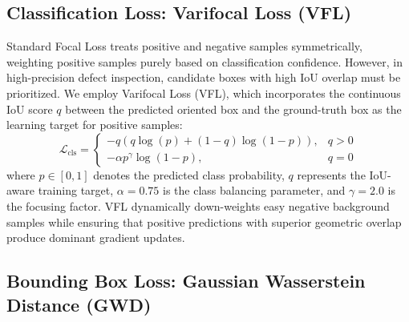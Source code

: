 \subsection{Classification Loss: Varifocal Loss (VFL)}
\label{subsec:vfl}

Standard Focal Loss treats positive and negative samples symmetrically, weighting positive samples purely based on classification confidence. However, in high-precision defect inspection, candidate boxes with high IoU overlap must be prioritized. We employ Varifocal Loss (VFL), which incorporates the continuous IoU score $q$ between the predicted oriented box and the ground-truth box as the learning target for positive samples:
\begin{equation}
\label{eq:vfl}
\mathcal{L}_{\text{cls}} = \begin{cases} 
- q \left( q \log(p) + (1 - q) \log(1 - p) \right), & q > 0 \\ 
- \alpha p^{\gamma} \log(1 - p), & q = 0 
\end{cases}
\end{equation}
where $p \in [0, 1]$ denotes the predicted class probability, $q$ represents the IoU-aware training target, $\alpha = 0.75$ is the class balancing parameter, and $\gamma = 2.0$ is the focusing factor. VFL dynamically down-weights easy negative background samples while ensuring that positive predictions with superior geometric overlap produce dominant gradient updates.

\subsection{Bounding Box Loss: Gaussian Wasserstein Distance (GWD)}
\label{subsec:gwd}

